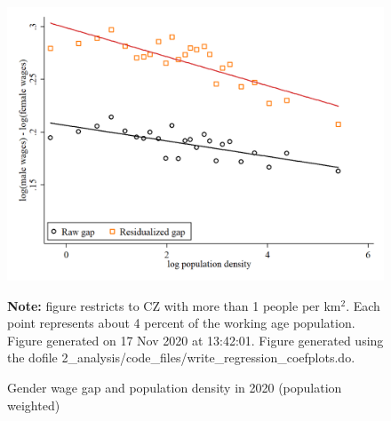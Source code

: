 \begin{figure}[!h]
\centering
\caption{Gender wage gap and population density in 2020 (population weighted)}
\includegraphics[width=1\textwidth]{../2_analysis/output/figures/l_czone_density_2020_hum}
\par \begin{minipage}[h]{\textwidth}{\tiny\textbf{Note:} figure restricts to CZ with more than 1 people per km$^2$. Each point represents about 4 percent of the working age population. Figure generated on 17 Nov 2020 at 13:42:01. Figure generated using the dofile 2\_analysis/code\_files/write\_regression\_coefplots.do.}\end{minipage}
\end{figure}
